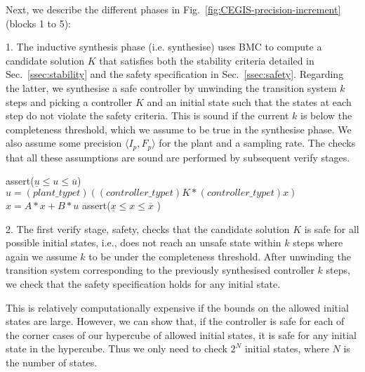 \documentclass[runningheads,a4paper]{llncs}
\begin{document}
\medskip

Next, we describe the different phases in Fig.~\ref{fig:CEGIS-precision-increment}
(blocks 1 to 5):


1. The inductive synthesis phase (i.e. {\sc synthesise}) uses BMC to
compute a candidate solution $K$
that satisfies both the stability criteria detailed in 
Sec.~\ref{ssec:stability} and the safety specification in Sec.~\ref{ssec:safety}.
Regarding the latter, we synthesise a safe controller by unwinding the transition system
$k$ steps and picking a controller $K$ and an initial state such that the states at each step do
not violate the safety criteria. This is sound if the current $k$ is below the
completeness threshold, which we assume to be true in the {\sc synthesise} phase.
We also assume some
precision $\langle I_p,F_p\rangle$ for the plant and a sampling rate.  The
checks that all these assumptions are sound are performed by subsequent
{\sc verify} stages.



\begin{algorithm}[]
\begin{algorithmic}[1]
	\State assert($ \underline{u}  \leq u \leq \overline{u}$)
		\State $u = (plant\_typet)((controller\_typet)K * (controller\_typet) x)$
		\State $x = A * x + B * u$
		\State assert($\underline{x} \leq x \leq \overline{x}$ )
  	\EndWhile
\EndFunction
\end{algorithmic}
\label{alg:safetycheck}
\end{algorithm}

2. The first {\sc verify} stage, {\sc safety}, checks that the candidate
solution $K$ is safe for all possible initial states, i.e., does not reach an unsafe
state within $k$ steps where again we assume $k$ to be under the completeness threshold. 
After unwinding the transition system corresponding to the previously synthesised controller
$k$ steps, we check that the safety specification holds for any initial state. 

This is relatively computationally expensive if the bounds on the
allowed initial states are large.  However, we can show that, if the
controller is safe for each of the corner cases of our hypercube of
allowed initial states, it is safe for any initial state in the
hypercube. Thus we only need to check $2^N$ initial states, where $N$
is the number of states.
\end{document}
